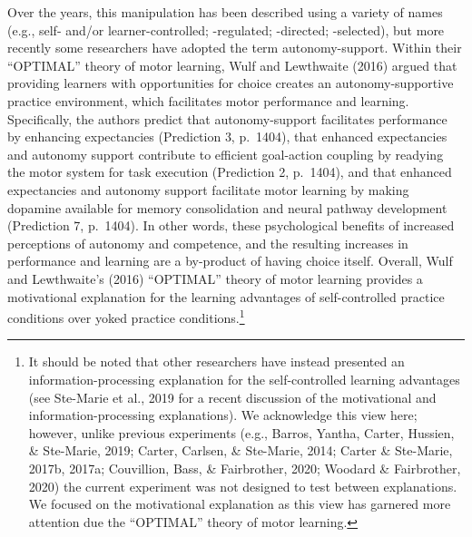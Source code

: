 \documentclass[
  english,
  doc, donotrepeattitle,floatsintext]{apa7}
\begin{document}
Over the years, this manipulation has been described using a variety of names (e.g., self- and/or learner-controlled; -regulated; -directed; -selected), but more recently some researchers have adopted the term autonomy-support. Within their ``OPTIMAL'' theory of motor learning, Wulf and Lewthwaite (2016) argued that providing learners with opportunities for choice creates an autonomy-supportive practice environment, which facilitates motor performance and learning. Specifically, the authors predict that autonomy-support facilitates performance by enhancing expectancies (Prediction 3, p.~1404), that enhanced expectancies and autonomy support contribute to efficient goal-action coupling by readying the motor system for task execution (Prediction 2, p.~1404), and that enhanced expectancies and autonomy support facilitate motor learning by making dopamine available for memory consolidation and neural pathway development (Prediction 7, p.~1404). In other words, these psychological benefits of increased perceptions of autonomy and competence, and the resulting increases in performance and learning are a by-product of having choice itself. Overall, Wulf and Lewthwaite's (2016) ``OPTIMAL'' theory of motor learning provides a motivational explanation for the learning advantages of self-controlled practice conditions over yoked practice conditions.\footnote{It should be noted that other researchers have instead presented an information-processing explanation for the self-controlled learning advantages (see Ste-Marie et al., 2019 for a recent discussion of the motivational and information-processing explanations). We acknowledge this view here; however, unlike previous experiments (e.g., Barros, Yantha, Carter, Hussien, \& Ste-Marie, 2019; Carter, Carlsen, \& Ste-Marie, 2014; Carter \& Ste-Marie, 2017b, 2017a; Couvillion, Bass, \& Fairbrother, 2020; Woodard \& Fairbrother, 2020) the current experiment was not designed to test between explanations. We focused on the motivational explanation as this view has garnered more attention due the ``OPTIMAL'' theory of motor learning.}
\end{document}
